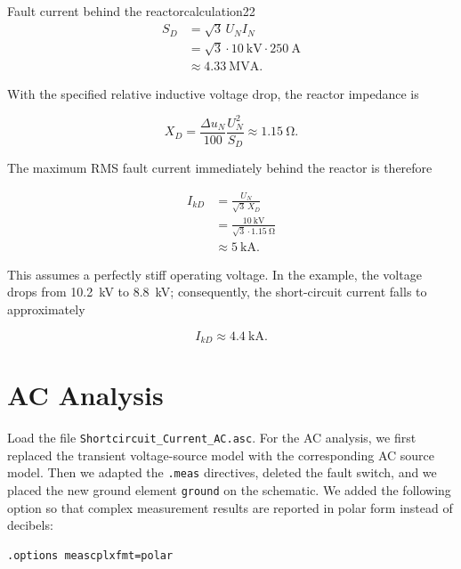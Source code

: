 \begin{calculation}{Fault current behind the reactor}{calculation22}
\begin{align}
S_D
  &= \sqrt{3}\,U_N I_N \\
  &= \sqrt{3}\cdot\SI{10}{\kilo\volt}
     \cdot\SI{250}{\ampere} \\
  &\approx \SI{4.33}{\mega\volt\ampere}.
\end{align}

With the specified relative inductive voltage drop, the reactor impedance is

\begin{equation}
X_D=\frac{\Delta u_N}{100}\frac{U_N^2}{S_D}
   \approx\SI{1.15}{\ohm}.
\end{equation}

The maximum RMS fault current immediately behind the reactor is therefore

\begin{align}
I_{kD}
  &= \frac{U_N}{\sqrt{3}\,X_D} \\
  &= \frac{\SI{10}{\kilo\volt}}
          {\sqrt{3}\cdot\SI{1.15}{\ohm}} \\
  &\approx \SI{5}{\kilo\ampere}.
\end{align}

This assumes a perfectly stiff operating voltage. In the example, the voltage
drops from \SI{10.2}{\kilo\volt} to \SI{8.8}{\kilo\volt}; consequently, the
short-circuit current falls to approximately

\begin{equation}
	I_{kD}\approx\boxed{\SI{4.4}{\kilo\ampere}}.
\end{equation}
\end{calculation}

\section{AC Analysis}
\label{sec:scc-ac-analysis}
Load the file  \texttt{Shortcircuit\_Current\_AC.asc}. 
For the AC analysis, we first replaced the transient voltage-source model with the
corresponding AC source model. Then we adapted the \texttt{.meas} directives, deleted
the fault switch, and we placed the new ground element \texttt{ground} on the
schematic. We added the following option so that complex measurement results are
reported in polar form instead of decibels:

\begin{lstlisting}[style=LTspice]
.options meascplxfmt=polar
\end{lstlisting}

